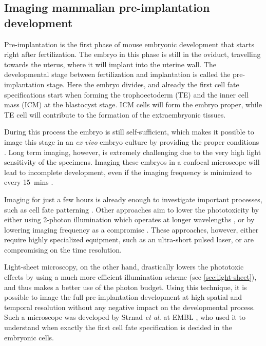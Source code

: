   \subsection{Imaging mammalian pre-implantation development}
  \label{ch:mouse-intro}
    Pre-implantation is the first phase of mouse embryonic development that starts right after fertilization. The embryo in this phase is still in the oviduct, travelling towards the uterus, where it will implant into the uterine wall. The developmental stage between fertilization and implantation is called the pre-implantation stage. Here the embryo divides, and already the first cell fate specifications start when forming the trophoectoderm (TE) and the inner cell mass (ICM) at the blastocyst stage. ICM cells will form the embryo proper, while TE cell will contribute to the formation of the extraembryonic tissues.
    
    During this process the embryo is still self-sufficient, which makes it possible to image this stage in an \textit{ex vivo} embryo culture by providing the proper conditions \cite{doherty_culture_2000}. Long term imaging, however, is extremely challenging due to the very high light sensitivity of the specimens. Imaging these embryos in a confocal microscope will lead to incomplete development, even if the imaging frequency is minimized to every \SI{15}{mins} \cite{strnad_inverted_2016}.

    Imaging for just a few hours is already enough to investigate important processes, such as cell fate patterning \cite{dietrich_stochastic_2007}. Other approaches aim to lower the phototoxicity by either using 2-photon illumination which operates at longer wavelengths \cite{denk_two-photon_1990,squirrell_long-term_1999,mcdole_lineage_2011}, or by lowering imaging frequency as a compromise \cite{yamagata_long-term_2009}. These approaches, however, either require highly specialized equipment, such as an ultra-short pulsed laser, or are compromising on the time resolution.

    Light-sheet microscopy, on the other hand, drastically lowers the phototoxic effects by using a much more efficient illumination scheme (see \autoref{sec:light-sheet}), and thus makes a better use of the photon budget. Using this technique, it is possible to image the full pre-implantation development at high spatial and temporal resolution without any negative impact on the developmental process. Such a microscope was developed by Strnad \textit{et al.} at EMBL \cite{strnad_inverted_2016}, who used it to understand when exactly the first cell fate specification is decided in the embryonic cells.

